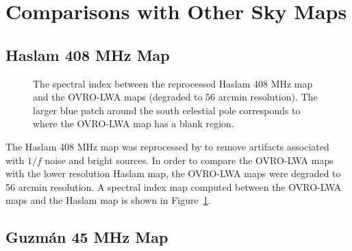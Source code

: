 \documentclass[twocolumn]{aastex61}
\begin{document}



\section{Comparisons with Other Sky Maps}

%

\subsection{Haslam 408 MHz Map}

\begin{figure}[t]
    \caption{
        The spectral index between the reprocessed Haslam 408 MHz map and the OVRO-LWA maps
        (degraded to 56 arcmin resolution).  The larger blue patch around the south celestial pole
        corresponds to where the OVRO-LWA map has a blank region.
    }
    \label{fig:haslam-spectral-index}
\end{figure}


The Haslam 408 MHz map \citep{1981A&A...100..209H, 1982A&AS...47....1H} was reprocessed by
\citet{2015MNRAS.451.4311R} to remove artifacts associated with $1/f$ noise and bright sources. In
order to compare the OVRO-LWA maps with the lower resolution Haslam map, the OVRO-LWA maps were
degraded to 56 arcmin resolution. A spectral index map computed between the OVRO-LWA maps and the
Haslam map is shown in Figure~\ref{fig:haslam-spectral-index}.

\subsection{Guzm\'{a}n 45 MHz Map}
\end{document}
